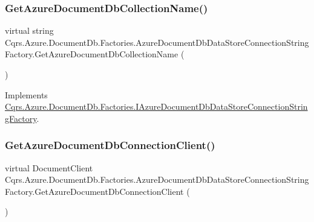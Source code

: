 \subsubsection{\texorpdfstring{Get\+Azure\+Document\+Db\+Collection\+Name()}{GetAzureDocumentDbCollectionName()}}
{\footnotesize\ttfamily virtual string Cqrs.\+Azure.\+Document\+Db.\+Factories.\+Azure\+Document\+Db\+Data\+Store\+Connection\+String\+Factory.\+Get\+Azure\+Document\+Db\+Collection\+Name (\begin{DoxyParamCaption}{ }\end{DoxyParamCaption})\hspace{0.3cm}{\ttfamily [virtual]}}



Implements \hyperlink{interfaceCqrs_1_1Azure_1_1DocumentDb_1_1Factories_1_1IAzureDocumentDbDataStoreConnectionStringFactory_a0ad3d0046331ea62ea2415f2c0af5675_a0ad3d0046331ea62ea2415f2c0af5675}{Cqrs.\+Azure.\+Document\+Db.\+Factories.\+I\+Azure\+Document\+Db\+Data\+Store\+Connection\+String\+Factory}.

\mbox{\label{classCqrs_1_1Azure_1_1DocumentDb_1_1Factories_1_1AzureDocumentDbDataStoreConnectionStringFactory_a0525c318c3930076e08ed83f9829ab2c_a0525c318c3930076e08ed83f9829ab2c}} 
\subsubsection{\texorpdfstring{Get\+Azure\+Document\+Db\+Connection\+Client()}{GetAzureDocumentDbConnectionClient()}}
{\footnotesize\ttfamily virtual Document\+Client Cqrs.\+Azure.\+Document\+Db.\+Factories.\+Azure\+Document\+Db\+Data\+Store\+Connection\+String\+Factory.\+Get\+Azure\+Document\+Db\+Connection\+Client (\begin{DoxyParamCaption}{ }\end{DoxyParamCaption})\hspace{0.3cm}{\ttfamily [virtual]}}



